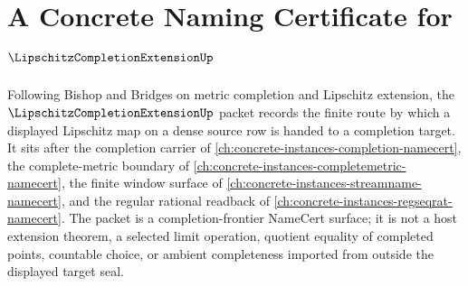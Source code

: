 \chapter{A Concrete Naming Certificate for $\LipschitzCompletionExtensionUp$}
\label{ch:concrete-instances-lipschitz-completion-extension-namecert}

Following Bishop and Bridges on metric completion and Lipschitz extension, the $\LipschitzCompletionExtensionUp$ packet records the finite route by which a displayed Lipschitz map on a dense source row is handed to a completion target. It sits after the completion carrier of \autoref{ch:concrete-instances-completion-namecert}, the complete-metric boundary of \autoref{ch:concrete-instances-completemetric-namecert}, the finite window surface of \autoref{ch:concrete-instances-streamname-namecert}, and the regular rational readback of \autoref{ch:concrete-instances-regseqrat-namecert}. The packet is a completion-frontier NameCert surface; it is not a host extension theorem, a selected limit operation, quotient equality of completed points, countable choice, or ambient completeness imported from outside the displayed target seal.

